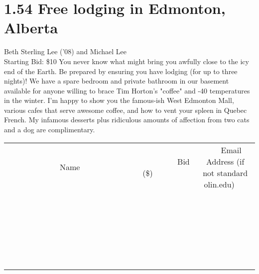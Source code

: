 \documentclass[11pt]{article}
\begin{document}
\section*{1.54 Free lodging in Edmonton, Alberta}
Beth Sterling Lee ('08) and Michael Lee
\\
Starting Bid: \$10
\newline
You never know what might bring you awfully close to the icy end of the Earth. Be prepared by ensuring you have lodging (for up to three nights)!  We have a spare bedroom and private bathroom in our basement available for anyone willing to brace Tim Horton's "coffee" and -40 temperatures in the winter. I'm happy to show you the famous-ish West Edmonton Mall, various cafes that serve awesome coffee, and how to vent your spleen in Quebec French. My infamous desserts plus ridiculous amounts of affection from two cats and a dog are complimentary.
\\[6ex]
\begin{tabular}{c c c}
~~~~~~~~~~~~~Name~~~~~~~~~~~~~ & ~~~~~~~~~Bid (\$)~~~~~~~~~  & ~~~Email Address (if not standard olin.edu)~~~\\
 & & \\
\hline
 & & \\
\hline
 & & \\
\hline
 & & \\
\hline
 & & \\
\hline
 & & \\
\hline
 & & \\
\hline
 & & \\
\hline
 & & \\
\hline
 & & \\
\hline
 & & \\
\hline
 & & \\
\hline
 & & \\
\hline
 & & \\
\hline
 & & \\
\hline
 & & \\
\hline
 & & \\
\hline
 & & \\
\hline
 & & \\
\hline
 & & \\
\hline
 & & \\
\hline
 & & \\
\hline
 & & \\
\hline
 & & \\
\hline
 & & \\
\hline
 & & \\
\hline
\end{tabular}
\newpage
\end{document}
